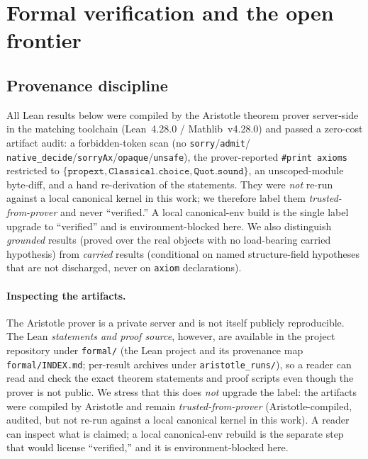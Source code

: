 \documentclass[runningheads]{llncs}
\newcommand{\tfp}{\emph{trusted-from-prover}}
\begin{document}
\section{Formal verification and the open frontier}\label{sec:formal}

\subsection{Provenance discipline}
All Lean results below were compiled by the Aristotle theorem prover server-side
in the matching toolchain (Lean~4.28.0 / Mathlib~v4.28.0) and passed a zero-cost
artifact audit: a forbidden-token scan (no \texttt{sorry}/\texttt{admit}/
\texttt{native\_decide}/\texttt{sorryAx}/\texttt{opaque}/\texttt{unsafe}), the
prover-reported \texttt{\#print axioms} restricted to
$\{\texttt{propext},\texttt{Classical.choice},\texttt{Quot.sound}\}$, an
unscoped-module byte-diff, and a hand re-derivation of the statements. They were
\emph{not} re-run against a local canonical kernel in this work; we therefore
label them \tfp{} and never ``verified.'' A local canonical-env build is the
single label upgrade to ``verified'' and is environment-blocked here. We also
distinguish \emph{grounded} results (proved over the real objects with no
load-bearing carried hypothesis) from \emph{carried} results (conditional on
named structure-field hypotheses that are not discharged, never on \texttt{axiom}
declarations).

\paragraph{Inspecting the artifacts.}
The Aristotle prover is a private server and is not itself publicly reproducible.
The Lean \emph{statements and proof source}, however, are available in the
project repository under \texttt{formal/} (the Lean project and its provenance
map \texttt{formal/INDEX.md}; per-result archives under
\texttt{aristotle\_runs/}), so a reader can read and check the exact theorem
statements and proof scripts even though the prover is not public. We stress that
this does \emph{not} upgrade the label: the artifacts were compiled by Aristotle
and remain \tfp{} (Aristotle-compiled, audited, but not re-run against a local
canonical kernel in this work). A reader can inspect what is claimed; a local
canonical-env rebuild is the separate step that would license ``verified,'' and
it is environment-blocked here.
\end{document}
